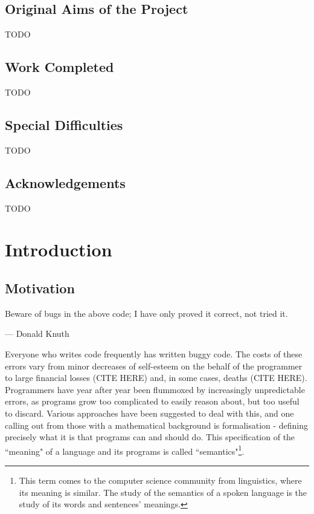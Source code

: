 \documentclass[12pt,a4paper,twoside,openright]{report}
\begin{document}
\section*{Original Aims of the Project}

TODO


\section*{Work Completed}

TODO

\section*{Special Difficulties}

TODO

\newpage

\tableofcontents

\listoffigures

\newpage
\section*{Acknowledgements}

TODO


\pagestyle{headings}

\chapter{Introduction}
\section{Motivation}
\epigraph{Beware of bugs in the above code; I have only proved it correct, not tried it.}{--- \textup{Donald Knuth}}

Everyone who writes code frequently has written buggy code. The costs of these errors vary from minor decreases of self-esteem on the behalf of the programmer to large financial losses (CITE HERE) and, in some cases, deaths (CITE HERE). Programmers have year after year been flummoxed by increasingly unpredictable errors, as programs grow too complicated to easily reason about, but too useful to discard. Various approaches have been suggested to deal with this, and one calling out from those with a mathematical background is formalisation - defining precisely what it is that programs can and should do. This specification of the ``meaning" of a language and its programs is called ``semantics"\footnote{This term comes to the computer science community from linguistics, where its meaning is similar. The study of the semantics of a spoken language is the study of its words and sentences' meanings.}. 
\end{document}
